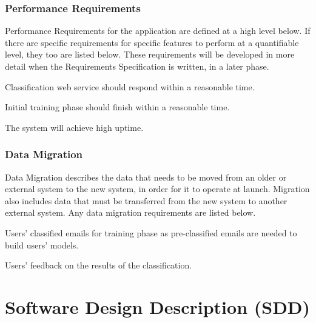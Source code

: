 \subsubsection{Performance Requirements}
Performance Requirements for the application are defined at a high level below. 
If there are specific requirements for specific features to perform at a quantifiable 
level, they too are listed below. These requirements will be developed in more detail when 
the Requirements Specification is written, in a later phase.

\begin{my_enumerate}
  \item Classification web service should respond within a reasonable time.
  \item Initial training phase should finish within a reasonable time.
  \item The system will achieve high uptime.
\end{my_enumerate}


\subsubsection{Data Migration}
Data Migration describes the data that needs to be moved from an older or external 
system to the new system, in order for it to operate at launch. Migration also includes 
data that must be transferred from the new system to another external system. 
Any data migration requirements are listed below.

\begin{my_enumerate}
  \item Users' classified emails for training phase as pre-classified emails are needed to build users' models.
  \item Users' feedback on the results of the classification.
\end{my_enumerate}


\section{Software Design Description (SDD)}


